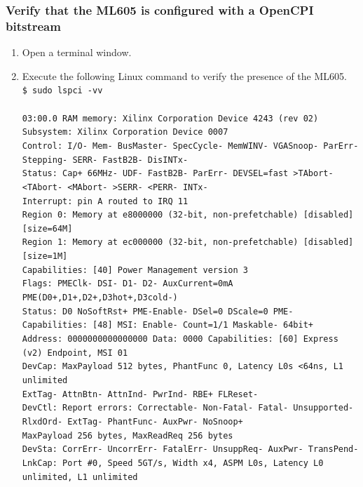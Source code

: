\documentclass{article}
\newcommand{\shellcmd}[1]{\texttt{\$ #1\\}}
\begin{document}
\subsubsection*{Verify that the ML605 is configured with a OpenCPI bitstream}
\begin{enumerate}
\item Open a terminal window.
\item Execute the following Linux command to verify the presence of the ML605.\\
\noindent\shellcmd{ sudo lspci -vv\\ \\
03:00.0 RAM memory: Xilinx Corporation Device 4243 (rev 02)\\
Subsystem: Xilinx Corporation Device 0007\\
Control: I/O- Mem- BusMaster- SpecCycle- MemWINV- VGASnoop- ParErr- Stepping- SERR- FastB2B- DisINTx-\\
Status: Cap+ 66MHz- UDF- FastB2B- ParErr- DEVSEL=fast >TAbort- <TAbort- <MAbort- >SERR- <PERR- INTx-\\
	Interrupt: pin A routed to IRQ 11\\
	Region 0: Memory at e8000000 (32-bit, non-prefetchable) [disabled] [size=64M]\\
	Region 1: Memory at ec000000 (32-bit, non-prefetchable) [disabled] [size=1M]\\
	Capabilities: [40] Power Management version 3\\
		Flags: PMEClk- DSI- D1- D2- AuxCurrent=0mA PME(D0+,D1+,D2+,D3hot+,D3cold-)\\
		Status: D0 NoSoftRst+ PME-Enable- DSel=0 DScale=0 PME-\\
	Capabilities: [48] MSI: Enable- Count=1/1 Maskable- 64bit+\\
		Address: 0000000000000000  Data: 0000
	Capabilities: [60] Express (v2) Endpoint, MSI 01\\
		DevCap:	MaxPayload 512 bytes, PhantFunc 0, Latency L0s <64ns, L1 unlimited\\
			ExtTag- AttnBtn- AttnInd- PwrInd- RBE+ FLReset-\\
		DevCtl:	Report errors: Correctable- Non-Fatal- Fatal- Unsupported-\\
			RlxdOrd- ExtTag- PhantFunc- AuxPwr- NoSnoop+\\
			MaxPayload 256 bytes, MaxReadReq 256 bytes\\
		DevSta:	CorrErr- UncorrErr- FatalErr- UnsuppReq- AuxPwr- TransPend-\\
		LnkCap:	Port \#0, Speed 5GT/s, Width x4, ASPM L0s, Latency L0 unlimited, L1 unlimited\\
}
\end{enumerate}
\end{document}
